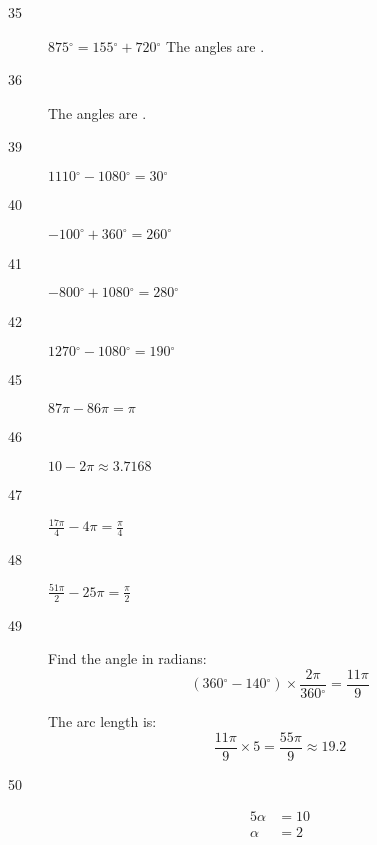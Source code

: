 \documentclass{exam}
\newcommand{\degree}{\ensuremath{^\circ}}
\begin{document}
\begin{description}
      \item[35] $875 \degree = 155 \degree + 720 \degree$
        The angles are .

      \item[36] The angles are .



      \item[39] $1110 \degree - 1080 \degree = \boxed{ 30 \degree }$

      \item[40] $-100 \degree + 360 \degree = \boxed{ 260 \degree }$

      \item[41] $-800 \degree + 1080 \degree = \boxed{ 280 \degree }$

      \item[42] $1270 \degree - 1080 \degree = \boxed{ 190 \degree }$



      \item[45] $87 \pi - 86 \pi = \boxed{ \pi }$

      \item[46] $10 - 2 \pi \approx \boxed{ 3.7168 }$

      \item[47] $\frac{17 \pi}{4} - 4 \pi = \boxed{ \frac{\pi}{4} }$

      \item[48] $\frac{51 \pi}{2} - 25 \pi = \boxed{ \frac{\pi}{2} }$

      \item[49]
        Find the angle in radians:
        \[
          (360 \degree - 140 \degree) \times \frac{2 \pi}{360 \degree} = \frac{11 \pi}{9}
        \]

        The arc length is:
        \[
          \frac{11 \pi}{9} \times 5 = \frac{55 \pi}{9} \approx \boxed{ 19.2 }
        \]

      \item[50]
        \begin{align*}
          5 \alpha & = 10 \\
          \alpha   & = \boxed{ 2 } \\
        \end{align*}


\end{description}
\end{document}
